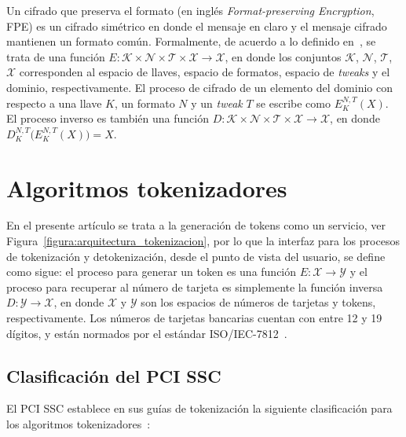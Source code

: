\documentclass[conference]{IEEEtran}
\begin{document}
  Un cifrado que preserva el formato (en inglés \textit{Format-preserving
  Encryption}, FPE) es un cifrado simétrico en donde el mensaje en claro y el
  mensaje cifrado mantienen un formato común. Formalmente, de acuerdo a lo
  definido en~\cite{DBLP:conf/sacrypt/BellareRRS09}, se trata de una función $
  E: \mathcal{K} \times \mathcal{N} \times \mathcal{T} \times \mathcal{X}
  \rightarrow \mathcal{X} $, en donde los conjuntos $ \mathcal{K} $, $
  \mathcal{N} $, $ \mathcal{T} $, $ \mathcal{X} $ corresponden al espacio de
  llaves, espacio de formatos, espacio de \textit{tweaks} y el dominio,
  respectivamente. El proceso de cifrado de un elemento del dominio con respecto
  a una llave $ K $, un formato $ N $ y un \textit{tweak} $ T $ se escribe como
  $ E_K^{N,T}(X) $. El proceso inverso es también una función $ D: \mathcal{K}
  \times \mathcal{N} \times \mathcal{T} \times \mathcal{X} \rightarrow
  \mathcal{X} $, en donde $ D_K^{N,T}\big( E_K^{N,T}(X) \big) = X $.

  \section{Algoritmos tokenizadores}
  \label{sec:algoritmos}

  En el presente artículo se trata a la generación de tokens como un servicio,
  ver Figura~\ref{figura:arquitectura_tokenizacion}, por lo que la interfaz para
  los procesos de tokenización y detokenización, desde el punto de vista del
  usuario, se define como sigue: el proceso para generar un token es una
  función $ E: \mathcal{X} \rightarrow \mathcal{Y} $ y el proceso para recuperar
  al número de tarjeta es simplemente la función inversa $ D: \mathcal{Y}
  \rightarrow \mathcal{X} $, en donde $ \mathcal{X} $ y $ \mathcal{Y}$ son los
  espacios de números de tarjetas y tokens, respectivamente. Los números de
  tarjetas bancarias cuentan con entre 12 y 19 dígitos, y están normados por el
  estándar ISO/IEC-7812~\cite{iso_7812}.

  \subsection{Clasificación del PCI SSC}
  \label{sec:clasificacion}

  El PCI SSC establece en sus guías de tokenización la siguiente clasificación
  para los algoritmos tokenizadores~\cite{pci_tokens}:
\end{document}
